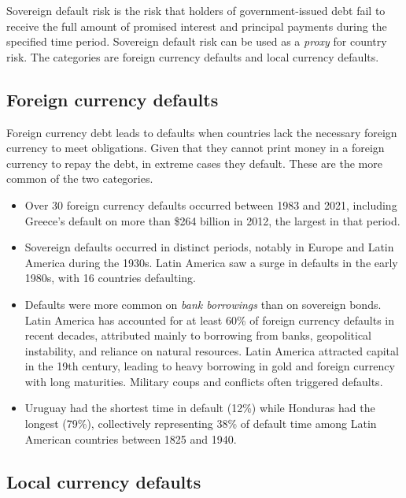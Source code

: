 
\begin{crdefbox}
Sovereign default risk is the risk that holders of government-issued debt fail to
receive the full amount of promised interest and principal payments during the
specified time period. Sovereign default risk can be used as a \emph{proxy} for
country risk. The categories are foreign currency defaults and local currency
defaults.
\end{crdefbox}

\subsection*{Foreign currency defaults}

Foreign currency debt leads to defaults when countries lack the necessary foreign
currency to meet obligations. Given that they cannot print money in a foreign
currency to repay the debt, in extreme cases they default. These are the more
common of the two categories.

\begin{itemize}
\item Over 30 foreign currency defaults occurred between 1983 and 2021, including
Greece's default on more than \$264 billion in 2012, the largest in that period.
\item Sovereign defaults occurred in distinct periods, notably in Europe and
Latin America during the 1930s. Latin America saw a surge in defaults in the
early 1980s, with 16 countries defaulting.
\item Defaults were more common on \emph{bank borrowings} than on sovereign
bonds. Latin America has accounted for at least 60\% of foreign currency defaults
in recent decades, attributed mainly to borrowing from banks, geopolitical
instability, and reliance on natural resources. Latin America attracted capital in
the 19th century, leading to heavy borrowing in gold and foreign currency with
long maturities. Military coups and conflicts often triggered defaults.
\item Uruguay had the shortest time in default (12\%) while Honduras had the
longest (79\%), collectively representing 38\% of default time among Latin
American countries between 1825 and 1940.
\end{itemize}

\subsection*{Local currency defaults}

